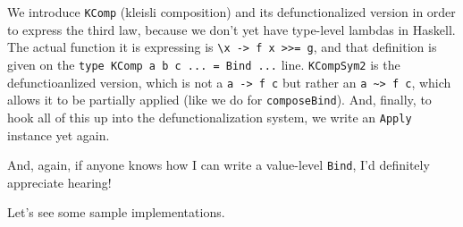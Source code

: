 \documentclass[]{article}
\begin{document}
We introduce \texttt{KComp} (kleisli composition) and its defunctionalized
version in order to express the third law, because we don't yet have type-level
lambdas in Haskell. The actual function it is expressing is
\texttt{\textbackslash{}x\ -\textgreater{}\ f\ x\ \textgreater{}\textgreater{}=\ g},
and that definition is given on the
\texttt{type\ KComp\ a\ b\ c\ ...\ =\ Bind\ ...} line. \texttt{KCompSym2} is the
defunctioanlized version, which is not a \texttt{a\ -\textgreater{}\ f\ c} but
rather an \texttt{a\ \textasciitilde{}\textgreater{}\ f\ c}, which allows it to
be partially applied (like we do for \texttt{composeBind}). And, finally, to
hook all of this up into the defunctionalization system, we write an
\texttt{Apply} instance yet again.

And, again, if anyone knows how I can write a value-level \texttt{Bind}, I'd
definitely appreciate hearing!

Let's see some sample implementations.
\end{document}
